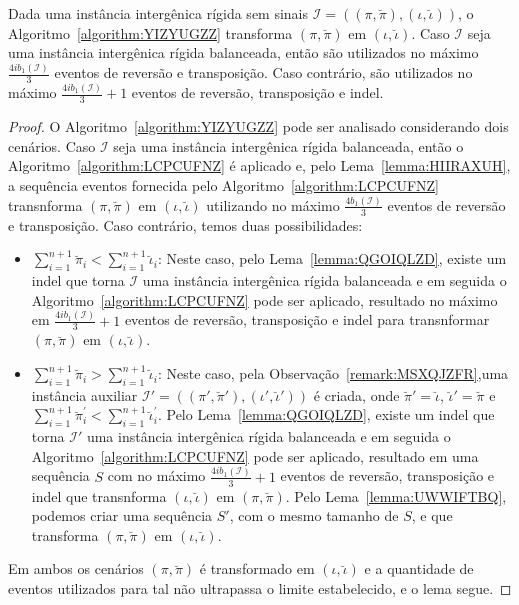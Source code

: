 \begin{lemma}\label{lemma:MUTXDAUG}
Dada uma instância intergênica rígida sem sinais $\mathcal{I}=((\pi,\breve\pi),(\iota,\breve\iota))$, o Algoritmo~\ref{algorithm:YIZYUGZZ} transforma $(\pi,\breve\pi)$ em $(\iota,\breve\iota)$. Caso $\mathcal{I}$ seja uma instância intergênica rígida balanceada, então são utilizados no máximo $\frac{4ib_1(\mathcal{I})}{3}$ eventos de reversão e transposição. Caso contrário, são utilizados no máximo $\frac{4ib_1(\mathcal{I})}{3} + 1$ eventos de reversão, transposição e indel.
\end{lemma}
\begin{proof}
O Algoritmo~\ref{algorithm:YIZYUGZZ} pode ser analisado considerando dois cenários. Caso $\mathcal{I}$ seja uma instância intergênica rígida balanceada, então o Algoritmo~\ref{algorithm:LCPCUFNZ} é aplicado e, pelo Lema~\ref{lemma:HIIRAXUH}, a sequência eventos fornecida pelo Algoritmo~\ref{algorithm:LCPCUFNZ} transnforma $(\pi,\breve\pi)$ em $(\iota,\breve\iota)$ utilizando no máximo $\frac{4b_1(\mathcal{I})}{3}$ eventos de reversão e transposição. Caso contrário, temos duas possibilidades:
\begin{itemize}
  \item $\sum_{i=1}^{n+1}\breve\pi_i < \sum_{i=1}^{n+1}\breve\iota_i$: Neste caso, pelo Lema~\ref{lemma:QGOIQLZD}, existe um indel que torna $\mathcal{I}$ uma instância intergênica rígida balanceada e em seguida o Algoritmo~\ref{algorithm:LCPCUFNZ} pode ser aplicado, resultado no máximo em $\frac{4ib_1(\mathcal{I})}{3} + 1$ eventos de reversão, transposição e indel para transnformar $(\pi,\breve\pi)$ em $(\iota,\breve\iota)$.
  \item $\sum_{i=1}^{n+1}\breve\pi_i > \sum_{i=1}^{n+1}\breve\iota_i$: Neste caso, pela Observação~\ref{remark:MSXQJZFR},uma instância auxiliar $\mathcal{I'}=((\pi',\breve\pi'),(\iota',\breve\iota'))$ é criada, onde $\breve\pi' = \breve\iota$, $\breve\iota' = \breve\pi$ e $\sum_{i=1}^{n+1}\breve\pi^{'}_i < \sum_{i=1}^{n+1}\breve\iota^{'}_i$. Pelo Lema~\ref{lemma:QGOIQLZD}, existe um indel que torna $\mathcal{I'}$ uma instância intergênica rígida balanceada e em seguida o Algoritmo~\ref{algorithm:LCPCUFNZ} pode ser aplicado, resultado em uma sequência $S$ com no máximo $\frac{4ib_1(\mathcal{I})}{3} + 1$ eventos de reversão, transposição e indel que transnforma $(\iota,\breve\iota)$ em $(\pi,\breve\pi)$. Pelo Lema~\ref{lemma:UWWIFTBQ}, podemos criar uma sequência $S'$, com o mesmo tamanho de $S$, e que transforma $(\pi,\breve\pi)$ em $(\iota,\breve\iota)$.
\end{itemize}
Em ambos os cenários $(\pi,\breve\pi)$ é transformado em $(\iota,\breve\iota)$ e a quantidade de eventos utilizados para tal não ultrapassa o limite estabelecido, e o lema segue.
\end{proof}


